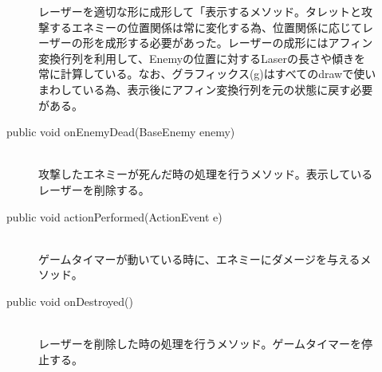 \documentclass[11pt,a4j]{jarticle}
\begin{document}
\begin{description}
\begin{description}
                    レーザーを適切な形に成形して「表示するメソッド。タレットと攻撃するエネミーの位置関係は常に変化する為、位置関係に応じてレーザーの形を成形する必要があった。レーザーの成形にはアフィン変換行列を利用して、Enemyの位置に対するLaserの長さや傾きを常に計算している。なお、グラフィックス(g)はすべてのdrawで使いまわしている為、表示後にアフィン変換行列を元の状態に戻す必要がある。
              \item[public void onEnemyDead(BaseEnemy enemy)] \mbox{}\\
                    攻撃したエネミーが死んだ時の処理を行うメソッド。表示しているレーザーを削除する。
              \item[public void actionPerformed(ActionEvent e)] \mbox{}\\
                    ゲームタイマーが動いている時に、エネミーにダメージを与えるメソッド。
              \item[public void onDestroyed()] \mbox{}\\
                    レーザーを削除した時の処理を行うメソッド。ゲームタイマーを停止する。
          \end{description}
\end{description}
\end{document}
